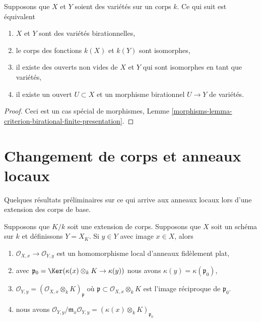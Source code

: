\begin{lemma}
\label{lemma-birational-varieties}
Supposons que $X$ et $Y$ soient des variétés
sur un corps $k$. Ce qui suit est équivalent
\begin{enumerate}
\item $X$ et $Y$ sont des variétés
birationnelles, \item le corps des fonctions $k(X)$
et $k(Y)$ sont isomorphes, \item il existe des
ouverts non vides de $X$ et $Y$ qui sont isomorphes en
tant que variétés, \item il existe un ouvert $U \subset
X$ et un morphisme birationnel $U \to Y$ de variétés.
\end{enumerate}
\end{lemma}

\begin{proof}
Ceci est un cas spécial de morphismes, Lemme
\ref{morphisms-lemma-criterion-birational-finite-presentation}.
\end{proof}







\section{Changement de corps et anneaux locaux}
\label{section-local-rings}

\noindent
Quelques résultats préliminaires sur ce qui arrive aux
anneaux locaux lors d'une extension des corps de base.

\begin{lemma}
\label{lemma-change-fields-flat}
Supposons que $K/k$ soit une extension de corps. Supposons que $X$ soit un
schéma sur $k$ et définissons $Y = X_K$. Si $y \in Y$ avec image $x \in X$, alors
\begin{enumerate}
\item $\mathcal{O}_{X, x} \to \mathcal{O}_{Y, y}$
est un homomorphisme local d'anneaux fidèlement
plat, \item avec $\mathfrak p_0 = \Ker(\kappa(x)
\otimes_k K \to \kappa(y))$ nous avons $\kappa(y) =
\kappa(\mathfrak p_0)$, \item $\mathcal{O}_{Y, y} =
(\mathcal{O}_{X, x} \otimes_k K)_\mathfrak p$ où
$\mathfrak p \subset \mathcal{O}_{X, x} \otimes_k K$
est l'image réciproque de $\mathfrak p_0$. \item
nous avons $\mathcal{O}_{Y, y}/\mathfrak
m_x\mathcal{O}_{Y, y} = (\kappa(x) \otimes_k K)_{\mathfrak p_0}$
\end{enumerate}
\end{lemma}


